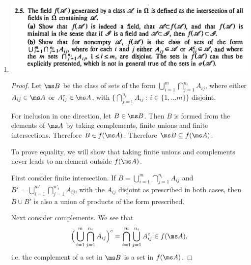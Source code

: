 \begin{enumerate}
\begin{enumerate}[label=(\alph*)]
    \begin{claim*}
      $f(\ms A)$ is minimal in the sense that if $\ms G$ is an algebra and $\ms A \subset \ms G$, then $f(\ms A) \subset \ms G$.
    \end{claim*}
    \begin{proof}
      If $\ms G$ is an algebra with $\ms A \subset \ms G$ then $\ms G \in \{\ms F_1, \ms F_2, \ldots\}$, therefore $\ms G \supset \bigcap_{n}\ms F_n = f(\ms A)$.
    \end{proof}

  \item
    \includegraphics[width=400pt]{img/analysis--berkeley-202a-hw-ab18.png}

    \begin{proof}
      Let $\ms B$ be the class of sets of the form $\bigcup_{i=1}^m \bigcap_{j=1}^{n_i} A_{ij}$, where
      either $A_{ij} \in \ms A$ or $A^c_{ij} \in \ms A$,
      with $\big\{\bigcap_{j=1}^{n_i} A_{ij} ~ : ~ i \in \{1, \ldots m\}\big\}$ disjoint.

      For inclusion in one direction, let $B \in \ms B$. Then $B$ is formed from the elements of $\ms A$ by
      taking complements, finite unions and finite intersections. Therefore $B \in f(\ms A)$.
      Therefore $\ms B \subseteq f(\ms A)$.

      To prove equality, we will show that taking finite unions and complements never leads to an element
      outside $f(\ms A)$.

      First consider finite intersection. If $B = \bigcup_{i=1}^m \bigcap_{j=1}^{n_i} A_{ij}$
      and $B' = \bigcup_{i=1}^{m'} \bigcap_{j=1}^{n'_i} A_{ij}$, with the $A_{ij}$ disjoint as prescribed in
      both cases, then $B \cup B'$ is also a union of products of the form prescribed.

      Next consider complements. We see that
      \begin{align*}
        \Big(\bigcup_{i=1}^m \bigcap_{j=1}^{n_i} A_{ij}\Big)^c
        = \bigcap_{i=1}^m \bigcup_{j=1}^{n_i} A^c_{ij}
        \in f(\ms A),
      \end{align*}
      i.e. the complement of a set in $\ms B$ is a set in $f(\ms A)$.
    \end{proof}


\end{enumerate}
\end{enumerate}
